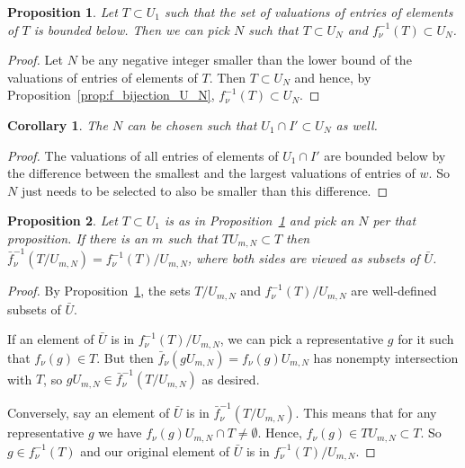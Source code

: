 \documentclass{amsart}
\newtheorem{prop}{Proposition}[subsection]
\newtheorem{corr}{Corollary}[subsection]
\theoremstyle{definition}
\def\f{f_\nu}
\def\ff{\bar{f}_\nu}
\def\Umn{U_{m,N}}
\def\U{\bar{U}}
\begin{document}
  \begin{prop}
    \label{prop:T_subset_U_N}
    Let $T \subset U_1$ such that the set of valuations of entries of elements
    of $T$ is bounded below. Then we can pick $N$ such that $T \subset U_N$ and
    $\f^{-1}(T) \subset U_N$.
  \end{prop}
  \begin{proof}
    Let $N$ be any negative integer smaller than the lower bound of the
    valuations of entries of elements of $T$.  Then $T \subset U_N$ and hence,
    by Proposition~\ref{prop:f_bijection_U_N}, $\f^{-1}(T) \subset U_N$.
  \end{proof}
  \begin{corr}
    \label{corr:T_subset_U_N}
    The $N$ can be chosen such that $U_1 \cap I' \subset U_N$ as well.
  \end{corr}
  \begin{proof}
    The valuations of all entries of elements of $U_1 \cap I'$ are bounded
    below by the difference between the smallest and the largest valuations of
    entries of $w$.  So $N$ just needs to be selected to also be smaller than
    this difference.
  \end{proof}

  \begin{prop}
    \label{prop:f_equals_fbar}
    Let $T \subset U_1$ is as in Proposition~\ref{prop:T_subset_U_N} and pick
    an $N$ per that proposition.  If there is an $m$ such that $T\Umn \subset
    T$ then $\ff^{-1}(T/\Umn) = \f^{-1}(T)/\Umn$, where both sides are viewed
    as subsets of $\U$.
  \end{prop}
  \begin{proof}
    By Proposition~\ref{prop:T_subset_U_N}, the sets $T/\Umn$ and
    $\f^{-1}(T)/\Umn$ are well-defined subsets of $\U$.

    If an element of $\U$ is in $\f^{-1}(T)/\Umn$, we can pick a representative
    $g$ for it such that $\f(g) \in T$.  But then $\ff(g\Umn) = \f(g)\Umn$ has
    nonempty intersection with $T$, so $g\Umn \in \ff^{-1}(T/\Umn)$ as desired.

    Conversely, say an element of $\U$ is in $\ff^{-1}(T/\Umn)$.  This means
    that for any representative $g$ we have $\f(g)\Umn \cap T \ne \emptyset$.
    Hence, $\f(g) \in T \Umn \subset T$.  So $g \in \f^{-1}(T)$ and our
    original element of $\U$ is in $\f^{-1}(T)/\Umn$.
  \end{proof}
\end{document}
